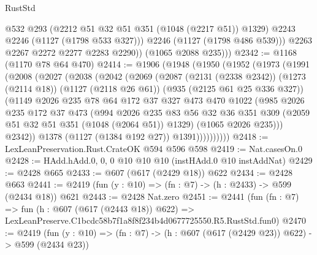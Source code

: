 \begin{lexlean}{RustStd}
\begin{coremodule}
                @532
                @293
                (@2212 @51 @32 @51 @351 (@1048 (@2217 @51)) @1329)
                @2243
                @2246
                (@1127 (@1798 @533 @327)))
              @2246
              (@1127 (@1798 @486 @539)))
            @2263
            @2267
            @2272
            @2277
            @2283
            @2290))
        (@1065 @2088 @235)))
@2342 := @1168 (@1170 @78 @64 @470)
@2414 := @1906
    (@1948
      (@1950
        (@1952
          (@1973
            (@1991
              (@2008
                (@2027
                  (@2038
                    (@2042
                      (@2069
                        (@2087
                          (@2131 (@2338 @2342))
                          (@1273 (@2114 @18))
                          (@1127 (@2118 @26 @61))
                          (@935 (@2125 @61 @25 @336 @327))
                          (@1149
                            @2026
                            @235
                            @78
                            @64
                            @172
                            @37
                            @327
                            @473
                            @470
                            @1022
                            (@985
                              @2026
                              @235
                              @172
                              @37
                              @473
                              (@994
                                @2026
                                @235
                                @83
                                @56
                                @32
                                @36
                                @351
                                @309
                                (@2059 @51 @32 @51 @351 (@1048 (@2064 @51)) @1329)
                                (@1065 @2026 @235)))
                            @2342))
                        @1378
                        (@1127 (@1384 @192 @27))
                        @1391))))))))))
@2418 := LexLeanPreservation.Rust.CrateOK @594 @596 @598
@2419 := Nat.casesOn.{0}
@2428 := HAdd.hAdd.{0, 0, 0} @10 @10 @10 (instHAdd.{0} @10 instAddNat)
@2429 := @2428 @665
@2433 := @607 (@617 (@2429 @18)) @622
@2434 := @2428 @663
@2441 := @2419 (fun (y : @10) => (fn : @7) -> (h : @2433) -> @599 (@2434 @18)) @621
@2443 := @2428 Nat.zero
@2451 := @2441
    (fun (fn : @7) =>
    fun (h : @607 (@617 (@2443 @18)) @622) =>
    LexLeanPreserve.C1bcdc58b7f1a8f8f234b4d0677725550.R5.RustStd.fun0)
@2470 := @2419
    (fun (y : @10) => (fn : @7) -> (h : @607 (@617 (@2429 @23)) @622) -> @599 (@2434 @23))

\end{coremodule}
\end{lexlean}
